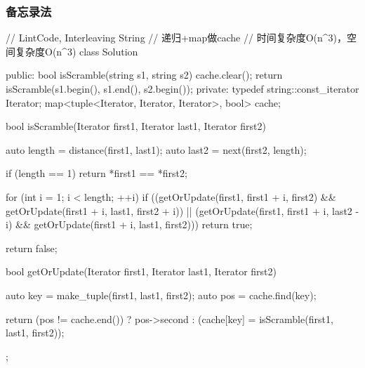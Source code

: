 \subsubsection{备忘录法}
\begin{Code}
// LintCode, Interleaving String
// 递归+map做cache
// 时间复杂度O(n^3)，空间复杂度O(n^3)
class Solution {
public:
    bool isScramble(string s1, string s2) {
        cache.clear();
        return isScramble(s1.begin(), s1.end(), s2.begin());
    }
private:
    typedef string::const_iterator Iterator;
    map<tuple<Iterator, Iterator, Iterator>, bool> cache;

    bool isScramble(Iterator first1, Iterator last1, Iterator first2) {
        auto length = distance(first1, last1);
        auto last2 = next(first2, length);

        if (length == 1) return *first1 == *first2;

        for (int i = 1; i < length; ++i)
            if ((getOrUpdate(first1, first1 + i, first2)
                    && getOrUpdate(first1 + i, last1, first2 + i))
                    || (getOrUpdate(first1, first1 + i, last2 - i)
                            && getOrUpdate(first1 + i, last1, first2)))
                return true;

        return false;
    }

    bool getOrUpdate(Iterator first1, Iterator last1, Iterator first2) {
        auto key = make_tuple(first1, last1, first2);
        auto pos = cache.find(key);

        return (pos != cache.end()) ?
                pos->second : (cache[key] = isScramble(first1, last1, first2));
    }
};
\end{Code}


